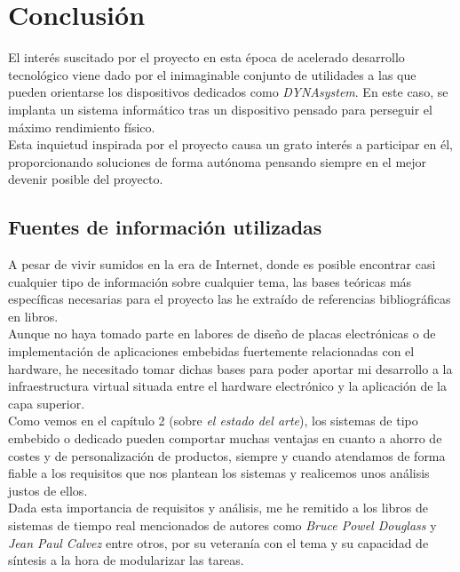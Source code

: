 \chapter{Conclusión}

El interés suscitado por el proyecto en esta época de acelerado desarrollo tecnológico viene dado por el inimaginable conjunto de utilidades a las que pueden orientarse los dispositivos dedicados como \textit{DYNAsystem}. En este caso, se implanta un sistema informático tras un dispositivo pensado para perseguir el máximo rendimiento físico.\\

Esta inquietud inspirada por el proyecto causa un grato interés a participar en él, proporcionando soluciones de forma autónoma pensando siempre en el mejor devenir posible del proyecto.\\

\section{Fuentes de información utilizadas}

A pesar de vivir sumidos en la era de Internet, donde es posible encontrar casi cualquier tipo de información sobre cualquier tema, las bases teóricas más específicas necesarias para el proyecto las he extraído de referencias bibliográficas en libros.\\

Aunque no haya tomado parte en labores de diseño de placas electrónicas o de implementación de aplicaciones embebidas fuertemente relacionadas con el hardware, he necesitado tomar dichas bases para poder aportar mi desarrollo a la infraestructura virtual situada entre el hardware electrónico y la aplicación de la capa superior.\\

Como vemos en el capítulo 2 (sobre \textit{el estado del arte}), los sistemas de tipo embebido o dedicado pueden comportar muchas ventajas en cuanto a ahorro de costes y de personalización de productos, siempre y cuando atendamos de forma fiable a los requisitos que nos plantean los sistemas y realicemos unos análisis justos de ellos.\\

Dada esta importancia de requisitos y análisis, me he remitido a los libros de sistemas de tiempo real mencionados de autores como \textit{Bruce Powel Douglass} y \textit{Jean Paul Calvez} entre otros, por su veteranía con el tema y su capacidad de síntesis a la hora de modularizar las tareas.\\

